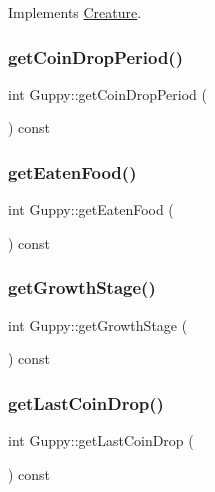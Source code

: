 Implements \mbox{\hyperlink{class_creature_a0d531a4c04c1021833ddb0e48864dbf4}{Creature}}.

\mbox{\label{class_guppy_a30d6fd06e3960eb1ea078bccdd23e12e}} 
\subsubsection{\texorpdfstring{get\+Coin\+Drop\+Period()}{getCoinDropPeriod()}}
{\footnotesize\ttfamily int Guppy\+::get\+Coin\+Drop\+Period (\begin{DoxyParamCaption}{ }\end{DoxyParamCaption}) const}

\mbox{\label{class_guppy_a0a57ee7e3bee04fb9dfe261e7f0f551e}} 
\subsubsection{\texorpdfstring{get\+Eaten\+Food()}{getEatenFood()}}
{\footnotesize\ttfamily int Guppy\+::get\+Eaten\+Food (\begin{DoxyParamCaption}{ }\end{DoxyParamCaption}) const}

\mbox{\label{class_guppy_a786cdeea3d03f342cedaedf85339ba20}} 
\subsubsection{\texorpdfstring{get\+Growth\+Stage()}{getGrowthStage()}}
{\footnotesize\ttfamily int Guppy\+::get\+Growth\+Stage (\begin{DoxyParamCaption}{ }\end{DoxyParamCaption}) const}

\mbox{\label{class_guppy_aeb89955aa47fafc160580a6d09363826}} 
\subsubsection{\texorpdfstring{get\+Last\+Coin\+Drop()}{getLastCoinDrop()}}
{\footnotesize\ttfamily int Guppy\+::get\+Last\+Coin\+Drop (\begin{DoxyParamCaption}{ }\end{DoxyParamCaption}) const}

